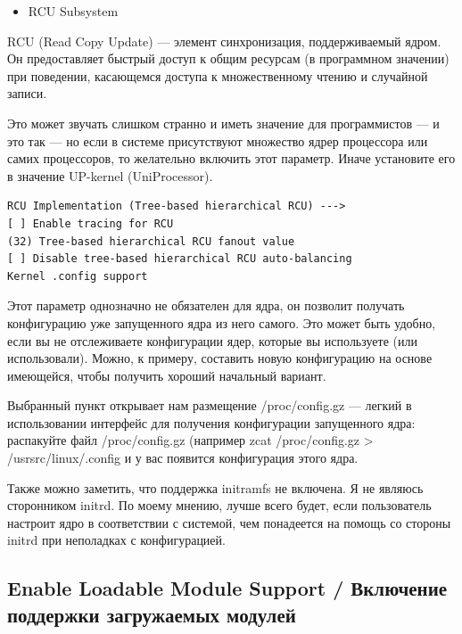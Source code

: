 \documentclass[10pt]{book}
\begin{document}
\begin{itemize}
\item RCU Subsystem
\end{itemize}

RCU (Read Copy Update) — элемент синхронизация, поддерживаемый ядром. Он предоставляет быстрый доступ к общим ресурсам (в программном значении) при поведении, касающемся доступа  к множественному чтению и случайной записи. 

Это может звучать слишком странно и иметь значение для программистов — и это так — но если в системе присутствуют множество ядрер процессора или самих процессоров, то желательно включить этот параметр. Иначе установите его в значение UP-kernel (UniProcessor).

\vspace{3mm}
\begin{tcolorbox}[colback=gray!14!white, colframe=blue!75!blue]
\begin{lstlisting}
RCU Implementation (Tree-based hierarchical RCU) --->
[ ] Enable tracing for RCU
(32) Tree-based hierarchical RCU fanout value
[ ] Disable tree-based hierarchical RCU auto-balancing
Kernel .config support
\end{lstlisting}
\end{tcolorbox}

Этот параметр однозначно не обязателен для ядра, он позволит получать конфигурацию уже запущенного ядра из него самого. Это может быть удобно, если вы не отслеживаете конфигурации ядер, которые вы используете (или использовали). Можно, к примеру, составить новую конфигурацию на основе имеющейся, чтобы получить хороший начальный вариант.

Выбранный пункт открывает нам размещение  /proc/config.gz — легкий в использовании интерфейс для получения конфигурации запущенного ядра: распакуйте  файл /proc/config.gz (например zcat  /proc/config.gz >  /usrsrc/linux/.config и у вас появится конфигурация этого ядра.

Также можно заметить, что поддержка initramfs не включена. Я не являюсь сторонником initrd. По моему мнению, лучше всего будет, если пользователь настроит ядро в соответствии с системой, чем понадеется на помощь со стороны initrd при неполадках с конфигурацией.

\subsection{Enable Loadable Module Support / Включение поддержки загружаемых модулей}
\end{document}
